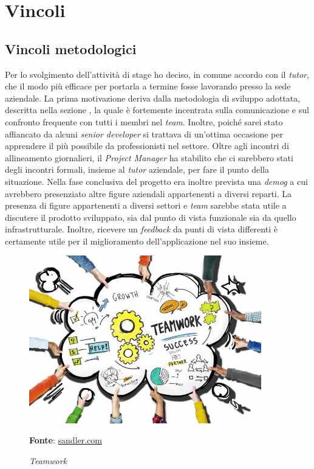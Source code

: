 \newpage

\section{Vincoli}
    \subsection{Vincoli metodologici}
        Per lo svolgimento dell'attività di stage ho deciso, in comune accordo con il \textit{tutor}, che il modo più efficace per portarla a termine fosse lavorando presso la sede aziendale. La prima motivazione deriva dalla metodologia di sviluppo adottata, descritta nella sezione , la quale è fortemente incentrata sulla comunicazione e sul confronto frequente con tutti i membri nel \textit{team}. Inoltre, poiché sarei stato affiancato da alcuni \textit{senior developer} si trattava di un'ottima occasione per apprendere il più possibile da professionisti nel settore.
        Oltre agli incontri di allineamento giornalieri, il \textit{Project Manager} ha stabilito che ci sarebbero stati degli incontri formali, insieme al \textit{tutor} aziendale, per fare il punto della situazione. Nella fase conclusiva del progetto era inoltre prevista una \textit{\gls{demog}} a cui avrebbero presenziato altre figure aziendali appartenenti a diversi reparti.
        La presenza di figure appartenenti a diversi settori e \textit{team} sarebbe stata utile a discutere il prodotto sviluppato, sia dal punto di vista funzionale sia da quello infrastrutturale. Inoltre, ricevere un \textit{feedback} da punti di vista differenti è certamente utile per il miglioramento dell'applicazione nel suo insieme.
        
        \begin{figure}[ht]
            \centering
            \includegraphics[width=0.9\textwidth]{immagini/team.jpg}
            \caption{\textit{Teamwork}}
            \textbf{Fonte}:
            \href{https://www.sandler.com/blog/6-benefits-of-teamwork-in-the-workplace/}{sandler.com}
            \label{fig: Teamwork}
        \end{figure}
\newpage
